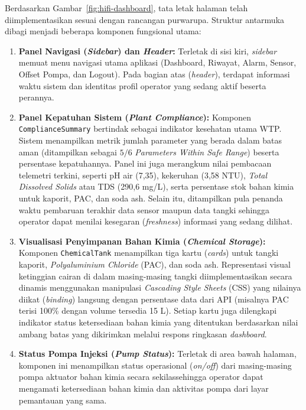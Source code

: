 Berdasarkan Gambar~\ref{fig:hifi-dashboard}, tata letak halaman telah diimplementasikan sesuai dengan rancangan purwarupa. 
Struktur antarmuka dibagi menjadi beberapa komponen fungsional utama:
\begin{enumerate}
    \item \textbf{Panel Navigasi (\textit{Sidebar}) dan \textit{Header}:} 
    Terletak di sisi kiri, \textit{sidebar} memuat menu navigasi utama aplikasi (Dashboard, Riwayat, Alarm, Sensor, Offset 
    Pompa, dan Logout). Pada bagian atas (\textit{header}), terdapat informasi waktu sistem dan identitas profil operator 
    yang sedang aktif beserta perannya.

    \item \textbf{Panel Kepatuhan Sistem (\textit{Plant Compliance}):}
    Komponen \texttt{ComplianceSummary} bertindak sebagai indikator kesehatan utama WTP. Sistem menampilkan metrik 
    jumlah parameter yang berada dalam batas aman (ditampilkan sebagai $5/6$ \textit{Parameters Within Safe Range}) 
    beserta persentase kepatuhannya. Panel ini juga merangkum nilai pembacaan telemetri terkini, seperti pH air (7,35), 
    kekeruhan (3,58 NTU), \textit{Total Dissolved Solids} atau TDS (290,6 mg/L), serta persentase stok bahan kimia 
    untuk kaporit, PAC, dan soda ash. Selain itu, ditampilkan pula penanda waktu pembaruan terakhir data sensor maupun 
    data tangki sehingga operator dapat menilai kesegaran (\textit{freshness}) informasi yang sedang dilihat.

    \item \textbf{Visualisasi Penyimpanan Bahan Kimia (\textit{Chemical Storage}):}
    Komponen \texttt{ChemicalTank} menampilkan tiga kartu (\textit{cards}) untuk tangki kaporit, 
    \textit{Polyaluminium Chloride} (PAC), dan soda ash. Representasi visual ketinggian cairan di dalam masing-masing 
    tangki diimplementasikan secara dinamis menggunakan manipulasi \textit{Cascading Style Sheets} (CSS) yang nilainya 
    diikat (\textit{binding}) langsung dengan persentase data dari API (misalnya PAC terisi 100\% dengan volume tersedia 
    15 L). Setiap kartu juga dilengkapi indikator status ketersediaan bahan kimia yang ditentukan berdasarkan nilai 
    ambang batas yang dikirimkan melalui respons ringkasan \textit{dashboard}.

    \item \textbf{Status Pompa Injeksi (\textit{Pump Status}):}
    Terletak di area bawah halaman, komponen ini menampilkan status operasional (\textit{on/off}) dari masing-masing 
    pompa aktuator bahan kimia secara sekilassehingga operator dapat mengamati ketersediaan bahan kimia dan aktivitas 
    pompa dari layar pemantauan yang sama.
\end{enumerate}

